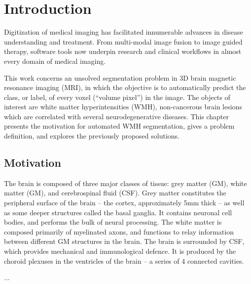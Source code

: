 \chapter{Introduction}
Digitization of medical imaging has facilitated innumerable advances in disease understanding and treatment. From multi-modal image fusion to image guided therapy, software tools now underpin research and clinical workflows in almost every domain of medical imaging.
\par
This work concerns an unsolved segmentation problem in 3D brain magnetic resonance imaging (MRI), in which the objective is to automatically predict the class, or label, of every voxel (``volume pixel'') in the image. The objects of interest are white matter hyperintensities (WMH), non-cancerous brain lesions which are correlated with several neurodegenerative diseases. This chapter presents the motivation for automated WMH segmentation, gives a problem definition, and explores the previously proposed solutions.
\section{Motivation}
The brain is composed of three major classes of tissue: grey matter (GM), white matter (GM), and cerebrospinal fluid (CSF). Grey matter constitutes the peripheral surface of the brain -- the cortex, approximately 5mm thick -- as well as some deeper structures called the basal ganglia. It contains neuronal cell bodies, and performs the bulk of neural processing. The white matter is composed primarily of myelinated axons, and functions to relay information between different GM structures in the brain. The brain is surrounded by CSF, which provides mechanical and immunological defence. It is produced by the choroid plexuses in the ventricles of the brain -- a series of 4 connected cavities.
\par
...
